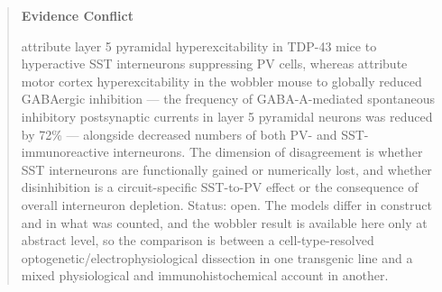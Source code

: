 \documentclass[11pt]{article}
\begin{document}
\begin{quote}
\noindent\textbf{Evidence Conflict}\par
\citet{Zhang2016} attribute layer 5 pyramidal hyperexcitability in TDP-43 mice to hyperactive SST interneurons suppressing PV cells, whereas \citet{NietoGonzalez2010} attribute motor cortex hyperexcitability in the wobbler mouse to globally reduced GABAergic inhibition --- the frequency of GABA-A-mediated spontaneous inhibitory postsynaptic currents in layer 5 pyramidal neurons was reduced by 72\% --- alongside decreased numbers of both PV- and SST-immunoreactive interneurons. The dimension of disagreement is whether SST interneurons are functionally gained or numerically lost, and whether disinhibition is a circuit-specific SST-to-PV effect or the consequence of overall interneuron depletion. Status: open. The models differ in construct and in what was counted, and the wobbler result is available here only at abstract level, so the comparison is between a cell-type-resolved optogenetic/electrophysiological dissection in one transgenic line and a mixed physiological and immunohistochemical account in another.

\end{quote}
\end{document}
